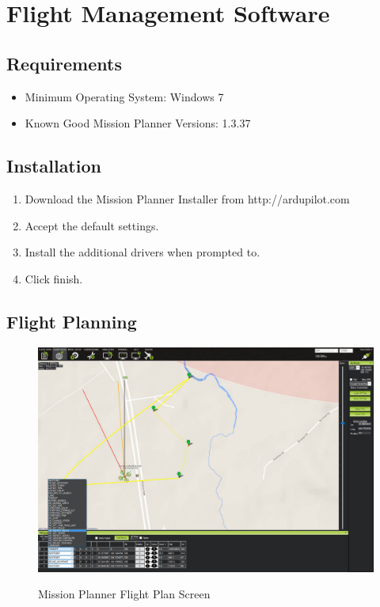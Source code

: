 \documentclass{report}
\begin{document}
\chapter{Flight Management Software}
	\section{Requirements}
		\begin{itemize}
			\item Minimum Operating System: Windows 7
			\item Known Good Mission Planner Versions: 1.3.37
		\end{itemize}
	\section{Installation}
		\begin{enumerate}
			\item Download the Mission Planner Installer from http://ardupilot.com
			\item Accept the default settings.
			\item Install the additional drivers when prompted to.
			\item Click finish.
		\end{enumerate}
	\section{Flight Planning}
		\begin{figure}[ht]
			\centering
			\caption{Mission Planner Flight Plan Screen}
			\includegraphics[width=\textwidth]{mp_flight_plan_screen.jpg}
			\label{fig:mp_flight_plan}
		\end{figure}
\end{document}
